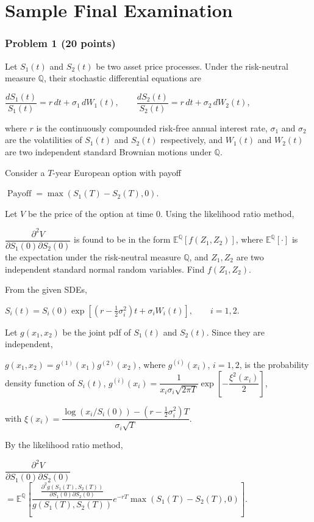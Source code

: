 \section{Sample Final Examination}

\subsubsection*{Problem 1 (20 points)}

 Let $S_1(t)$ and $S_2(t)$ be two asset price processes. Under the risk-neutral measure $\mathbb Q$, their stochastic differential equations are

$\dfrac{dS_1(t)}{S_1(t)}=r\,dt+\sigma_1\,dW_1(t),\qquad
\dfrac{dS_2(t)}{S_2(t)}=r\,dt+\sigma_2\,dW_2(t)$,

where $r$ is the continuously compounded risk-free annual interest rate, $\sigma_1$ and $\sigma_2$ are the volatilities of $S_1(t)$ and $S_2(t)$ respectively, and $W_1(t)$ and $W_2(t)$ are two independent standard Brownian motions under $\mathbb Q$.

Consider a $T$-year European option with payoff

$\operatorname{Payoff}=\max(S_1(T)-S_2(T),0)$.

Let $V$ be the price of the option at time 0. Using the likelihood ratio method,

$\dfrac{\partial^2V}{\partial S_1(0)\partial S_2(0)}$
is found to be in the form $\mathbb E^{\mathbb Q}[f(Z_1,Z_2)]$, where $\mathbb E^{\mathbb Q}[\cdot]$ is the expectation under the risk-neutral measure $\mathbb Q$, and $Z_1,Z_2$ are two independent standard normal random variables. Find $f(Z_1,Z_2)$.

 From the given SDEs,

$S_i(t)=S_i(0)\exp\left[\left(r-\frac12\sigma_i^2\right)t+\sigma_iW_i(t)\right],\qquad i=1,2$.

Let $g(x_1,x_2)$ be the joint pdf of $S_1(t)$ and $S_2(t)$. Since they are independent,

$g(x_1,x_2)=g^{(1)}(x_1)g^{(2)}(x_2)$,
where $g^{(i)}(x_i)$, $i=1,2$, is the probability density function of $S_i(t)$,
$g^{(i)}(x_i)=\dfrac1{x_i\sigma_i\sqrt{2\pi T}}\exp\left[-\dfrac{\xi^2(x_i)}2\right]$,

with
$\xi(x_i)=\dfrac{\log(x_i/S_i(0))-(r-\frac12\sigma_i^2)T}{\sigma_i\sqrt T}$.

By the likelihood ratio method,

$\dfrac{\partial^2V}{\partial S_1(0)\partial S_2(0)}$
$=\mathbb E^{\mathbb Q}\!\left[
\dfrac{\frac{\partial^2g(S_1(T),S_2(T))}{\partial S_1(0)\partial S_2(0)}}{g(S_1(T),S_2(T))}
e^{-rT}\max(S_1(T)-S_2(T),0)\right]$.

